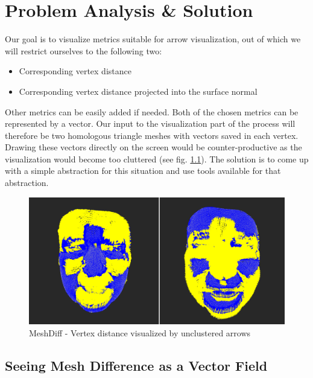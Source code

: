 \chapter{Problem Analysis \& Solution}

Our goal is to visualize metrics suitable for arrow visualization, out of which we will restrict ourselves to the following two:

\begin{itemize}
\item Corresponding vertex distance
\item Corresponding vertex distance projected into the surface normal
\end{itemize}

Other metrics can be easily added if needed. Both of the chosen metrics can be represented by a vector. Our input to the visualization part of the process will therefore be two homologous triangle meshes with vectors saved in each vertex. Drawing these vectors directly on the screen would be counter-productive as the visualization would become too cluttered (see fig. \ref{fig:meshdiff_unclustered}). The solution is to come up with a simple abstraction for this situation and use tools available for that abstraction.

\begin{figure}[h]
\centering
\includegraphics[width=\textwidth]{./img/meshdiff-unclustered_arrows.PNG}
\caption{MeshDiff - Vertex distance visualized by unclustered arrows}
\label{fig:meshdiff_unclustered}
\end{figure}

\section{Seeing Mesh Difference as a Vector Field}

